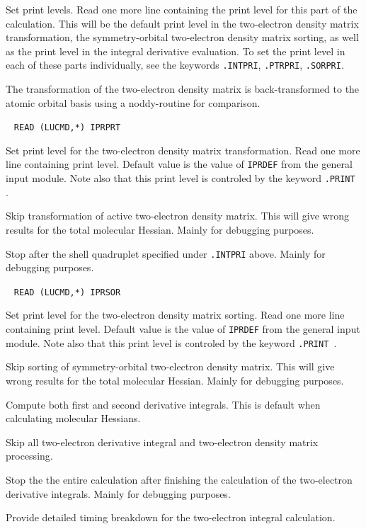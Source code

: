 \begin{description}
Set print levels.  Read one more line containing the print level for
this part of the calculation.  This will be the default print
level in the two-electron density matrix transformation, the 
symmetry-orbital two-electron density matrix sorting, as well as the
print level in the integral derivative evaluation. To set the print
level in each of these parts individually, see the keywords
\verb|.INTPRI|, \verb|.PTRPRI|, \verb|.SORPRI|.

\item[\Key{PTRNOD}] The transformation of the two-electron density
matrix is back-transformed to the atomic orbital basis using a
noddy-routine for comparison.

\item[\Key{PTRPRI}]\verb| |\newline
\verb|READ (LUCMD,*) IPRPRT|

Set print level for the two-electron density matrix transformation.
Read one more line containing print level. Default value is the
value of  \verb|IPRDEF| from the general input module. Note also that
this print level is controled by the keyword \verb|.PRINT |.

\item[\Key{PTRSKI}] Skip transformation of active two-electron
density matrix. This will give wrong results for the total molecular
Hessian. Mainly for debugging purposes.

\item[\Key{RETURN}] Stop after the shell quadruplet specified
under \verb|.INTPRI| above. Mainly for debugging purposes.

\item[\Key{SORPRI}]\verb| |\newline
\verb|READ (LUCMD,*) IPRSOR|

Set print level for the two-electron density matrix sorting. Read one
more line containing print level. Default value is the value of
\verb|IPRDEF| from the general input module. Note also that this print
level is controled by the keyword \verb|.PRINT |.

\item[\Key{SORSKI}] Skip sorting of symmetry-orbital two-electron
density matrix. This will give wrong results for the total molecular
Hessian. Mainly for debugging purposes.

\item[\Key{SECOND}] Compute both first and second derivative
integrals. This is default when calculating molecular Hessians.

\item[\Key{SKIP}] Skip all two-electron derivative integral
and two-electron density matrix processing.

\item[\Key{STOP}] Stop the the entire calculation after finishing
the calculation of the two-electron derivative integrals. Mainly for
debugging purposes.

\item[\Key{TIME}] Provide detailed timing breakdown for the
two-electron integral calculation.
\end{description}

